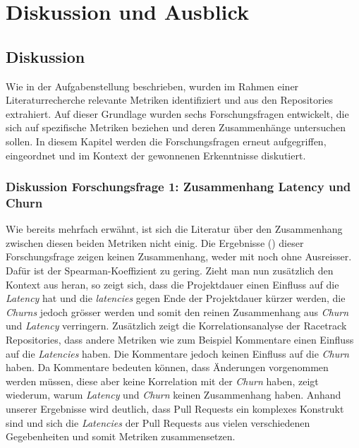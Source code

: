


\chapter{Diskussion und Ausblick} %

\label{Chapter5} %


\section{Diskussion}

Wie in der Aufgabenstellung beschrieben, wurden im Rahmen einer Literaturrecherche relevante Metriken identifiziert und aus den Repositories extrahiert. Auf dieser Grundlage wurden sechs Forschungsfragen entwickelt, die sich auf spezifische Metriken beziehen und deren Zusammenhänge untersuchen sollen. In diesem Kapitel werden die Forschungsfragen erneut aufgegriffen, eingeordnet und im Kontext der gewonnenen Erkenntnisse diskutiert.


\subsection{Diskussion Forschungsfrage 1: Zusammenhang Latency und Churn}
Wie bereits mehrfach erwähnt, ist sich die Literatur über den Zusammenhang zwischen diesen beiden Metriken nicht einig. Die Ergebnisse () dieser Forschungsfrage zeigen keinen Zusammenhang, weder mit noch ohne Ausreisser. Dafür ist der Spearman-Koeffizient zu gering. Zieht man nun zusätzlich den Kontext aus  heran, so zeigt sich, dass die Projektdauer einen Einfluss auf die \textit{Latency} hat und die \textit{latencies} gegen Ende der Projektdauer kürzer werden, die \textit{Churns} jedoch grösser werden und somit den reinen Zusammenhang aus \textit{Churn} und \textit{Latency} verringern. Zusätzlich zeigt die Korrelationsanalyse der Racetrack Repositories, dass andere Metriken wie zum Beispiel Kommentare einen Einfluss auf die \textit{Latencies} haben. Die Kommentare jedoch keinen Einfluss auf die \textit{Churn} haben. Da Kommentare bedeuten können, dass Änderungen vorgenommen werden müssen, diese aber keine Korrelation mit der \textit{Churn} haben, zeigt wiederum, warum \textit{Latency} und \textit{Churn} keinen Zusammenhang haben. Anhand unserer Ergebnisse wird deutlich, dass Pull Requests ein komplexes Konstrukt sind und sich die \textit{Latencies} der Pull Requests aus vielen verschiedenen Gegebenheiten und somit Metriken zusammensetzen.

